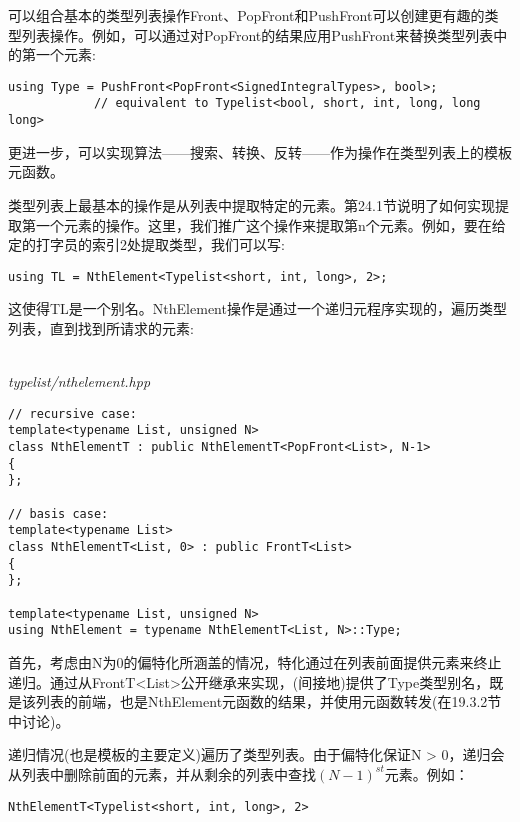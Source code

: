 
可以组合基本的类型列表操作Front、PopFront和PushFront可以创建更有趣的类型列表操作。例如，可以通过对PopFront的结果应用PushFront来替换类型列表中的第一个元素:

\begin{lstlisting}[style=styleCXX]
using Type = PushFront<PopFront<SignedIntegralTypes>, bool>;
			// equivalent to Typelist<bool, short, int, long, long long>
\end{lstlisting}

更进一步，可以实现算法——搜索、转换、反转——作为操作在类型列表上的模板元函数。


类型列表上最基本的操作是从列表中提取特定的元素。第24.1节说明了如何实现提取第一个元素的操作。这里，我们推广这个操作来提取第n个元素。例如，要在给定的打字员的索引2处提取类型，我们可以写:

\begin{lstlisting}[style=styleCXX]
using TL = NthElement<Typelist<short, int, long>, 2>;
\end{lstlisting}

这使得TL是一个别名。NthElement操作是通过一个递归元程序实现的，遍历类型列表，直到找到所请求的元素:

\hspace*{\fill} \\ %
\noindent
\textit{typelist/nthelement.hpp}
\begin{lstlisting}[style=styleCXX]
// recursive case:
template<typename List, unsigned N>
class NthElementT : public NthElementT<PopFront<List>, N-1>
{
};

// basis case:
template<typename List>
class NthElementT<List, 0> : public FrontT<List>
{
};

template<typename List, unsigned N>
using NthElement = typename NthElementT<List, N>::Type;
\end{lstlisting}

首先，考虑由N为0的偏特化所涵盖的情况，特化通过在列表前面提供元素来终止递归。通过从FrontT<List>公开继承来实现，(间接地)提供了Type类型别名，既是该列表的前端，也是NthElement元函数的结果，并使用元函数转发(在19.3.2节中讨论)。

递归情况(也是模板的主要定义)遍历了类型列表。由于偏特化保证N > 0，递归会从列表中删除前面的元素，并从剩余的列表中查找$ (N−1)^{st} $元素。例如：

\begin{lstlisting}[style=styleCXX]
NthElementT<Typelist<short, int, long>, 2>
\end{lstlisting}

